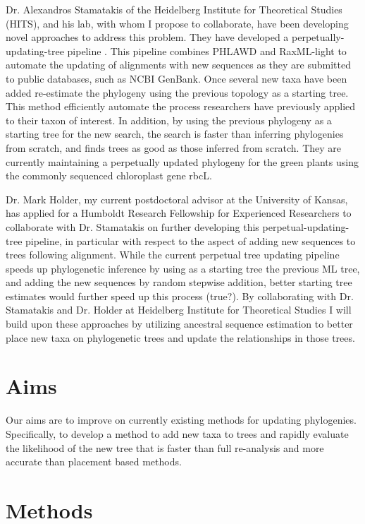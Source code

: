 \documentclass[10pt]{article}
\begin{document}
Dr. Alexandros Stamatakis of the Heidelberg Institute for Theoretical Studies (HITS), and his lab, with whom I propose to collaborate, have been developing novel approaches to address this problem. They have developed a perpetually-updating-tree pipeline \cite{izquierdo-carrasco_perpetual_????}. This pipeline combines PHLAWD \cite{smith_mega-phylogeny_2009} and RaxML-light \cite{stamatakis_RAxML-Light:_2012} to automate the updating of alignments with new sequences as they are submitted to public databases, such as NCBI GenBank. Once several new taxa have been added re-estimate the phylogeny using the previous topology as a starting tree. This method efficiently automate the process researchers have previously applied to their taxon of interest. In addition, by using the previous phylogeny as a starting tree for the new search, the search is faster than inferring phylogenies from scratch, and finds trees as good as those inferred from scratch. They  are currently maintaining a perpetually updated phylogeny for the green plants using the commonly sequenced chloroplast gene rbcL.

Dr. Mark Holder, my current postdoctoral advisor at the University of Kansas, has applied for a Humboldt Research Fellowship for Experienced Researchers to collaborate with Dr. Stamatakis on further developing this perpetual-updating-tree pipeline, in particular with respect to the aspect of adding new sequences to trees following alignment. While the current perpetual tree updating pipeline speeds up phylogenetic inference by using as a starting tree the previous ML tree, and adding the new sequences by random stepwise addition, better starting tree estimates would further speed up this process (true?).
By collaborating with Dr. Stamatakis and Dr. Holder at Heidelberg Institute for Theoretical Studies I will build upon these approaches by utilizing ancestral sequence estimation to better place new taxa on phylogenetic trees and update the relationships in those trees.


\section*{Aims}
Our aims are to improve on currently existing methods for updating phylogenies. Specifically, to develop a method to add new taxa to trees and rapidly evaluate the likelihood of the new tree that is faster than full re-analysis and more accurate than placement based methods.
 
\section*{Methods}
\end{document}
